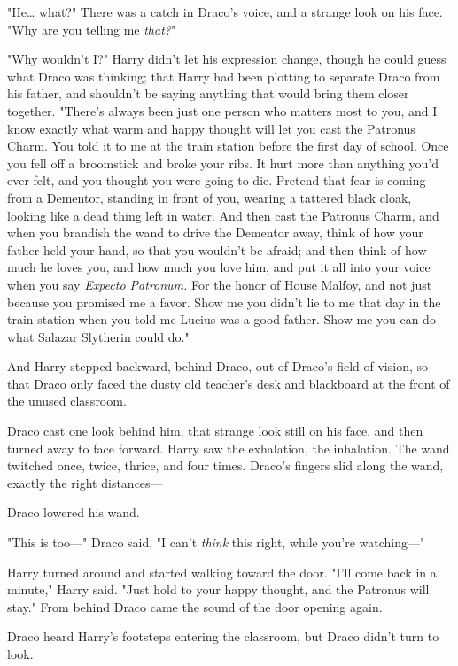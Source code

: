 "He{\ldots} what?" There was a catch in Draco's voice, and a strange look on 
his face. "Why are you telling me \emph{that?}"

"Why wouldn't I?" Harry didn't let his expression change, though he could guess 
what Draco was thinking; that Harry had been plotting to separate Draco from 
his father, and shouldn't be saying anything that would bring them closer 
together. "There's always been just one person who matters most to you, and I 
know exactly what warm and happy thought will let you cast the Patronus Charm. 
You told it to me at the train station before the first day of school. Once you 
fell off a broomstick and broke your ribs. It hurt more than anything you'd 
ever felt, and you thought you were going to die. Pretend that fear is coming 
from a Dementor, standing in front of you, wearing a tattered black cloak, 
looking like a dead thing left in water. And then cast the Patronus Charm, and 
when you brandish the wand to drive the Dementor away, think of how your father 
held your hand, so that you wouldn't be afraid; and then think of how much he 
loves you, and how much you love him, and put it all into your voice when you 
say \emph{Expecto Patronum.} For the honor of House Malfoy, and not just 
because you promised me a favor. Show me you didn't lie to me that day in the 
train station when you told me Lucius was a good father. Show me you can do 
what Salazar Slytherin could do."

And Harry stepped backward, behind Draco, out of Draco's field of vision, so 
that Draco only faced the dusty old teacher's desk and blackboard at the front 
of the unused classroom.

Draco cast one look behind him, that strange look still on his face, and then 
turned away to face forward. Harry saw the exhalation, the inhalation. The wand 
twitched once, twice, thrice, and four times. Draco's fingers slid along the 
wand, exactly the right distances---

Draco lowered his wand.

"This is too---" Draco said, "I can't \emph{think} this right, while you're 
watching---"

Harry turned around and started walking toward the door. "I'll come back in a 
minute," Harry said. "Just hold to your happy thought, and the Patronus will 
stay."
\sbreak
From behind Draco came the sound of the door opening again.

Draco heard Harry's footsteps entering the classroom, but Draco didn't turn to 
look.


